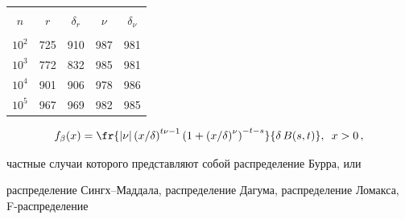 \begin{table}
\begin{minipage}[t]{63mm}
{\begin{center}
\vspace*{2ex}





\tabcolsep=10pt


\begin{tabular}{|c|c|c|c|c|}


\hline


&&&&\\[-9pt]


$n$ & $r$& ${\delta}_r$& $\nu$& $\delta_\nu$\\[2pt]


\hline


&&&&\\[-9pt]


$10^2$& 725& 910& 987& 981\\


$10^3$& 772& 832& 985& 981\\


$10^4$& 901& 906& 978& 986\\


$10^5$& 967& 969& 982& 985\\


\hline


\end{tabular}


\end{center}


}


\end{minipage}


\end{table}





\noindent


\begin{equation}


\label{Beta_density}%


f_\beta (x) = \fr{|\nu| \left(x/\delta\right)^{t\nu -


1}\left(1+\left(x/\delta\right)^\nu\right)^{-t-s}}{\delta \, B(s, t)}, \enskip 


x>0\,, 


\end{equation}


частные случаи которого представляют собой распределение Бурра, или 


распределение Сингх--Мад\-да\-ла, распределение Дагума, распределение Ломакса, F-рас\-пре\-де\-ле\-ние 



